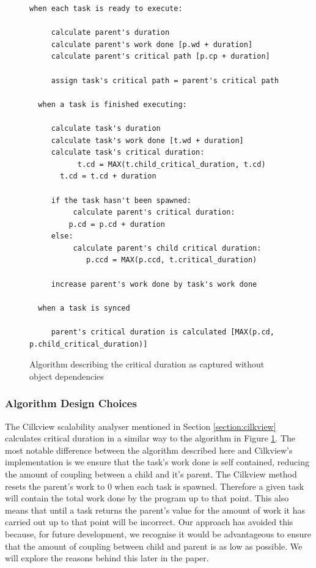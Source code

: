 \begin{figure}
  \begin{lstlisting}[breaklines, showstringspaces=false]
  when each task is ready to execute:

     calculate parent's duration
     calculate parent's work done [p.wd + duration]
     calculate parent's critical path [p.cp + duration]     

     assign task's critical path = parent's critical path

  when a task is finished executing:

     calculate task's duration
     calculate task's work done [t.wd + duration]
     calculate task's critical duration: 
     	   t.cd = MAX(t.child_critical_duration, t.cd)
	   t.cd = t.cd + duration

     if the task hasn't been spawned:     
          calculate parent's critical duration:
	     p.cd = p.cd + duration
     else:
          calculate parent's child critical duration:
     	     p.ccd = MAX(p.ccd, t.critical_duration)

     increase parent's work done by task's work done

  when a task is synced

     parent's critical duration is calculated [MAX(p.cd, p.child_critical_duration)]

  \end{lstlisting}
  \caption{Algorithm describing the critical duration as captured without object dependencies}
  \label{fig:code_nodeps}
\end{figure}

\subsubsection{Algorithm Design Choices}
The Cilkview scalability analyser mentioned in Section \ref{section:cilkview} calculates critical duration in a similar way to the algorithm in Figure \ref{fig:code_nodeps}. The most notable difference between the algorithm described here and Cilkview's implementation is we ensure that the task's work done is self contained, reducing the amount of coupling between a child and it's parent. The Cilkview method resets the parent's work to 0 when each task is spawned. Therefore a given task will contain the total work done by the program up to that point. This also means that until a task returns the parent's value for the amount of work it has carried out up to that point will be incorrect. Our approach has avoided this because, for future development, we recognise it would be advantageous to ensure that the amount of coupling between child and parent is as low as possible. We will explore the reasons behind this later in the paper.

